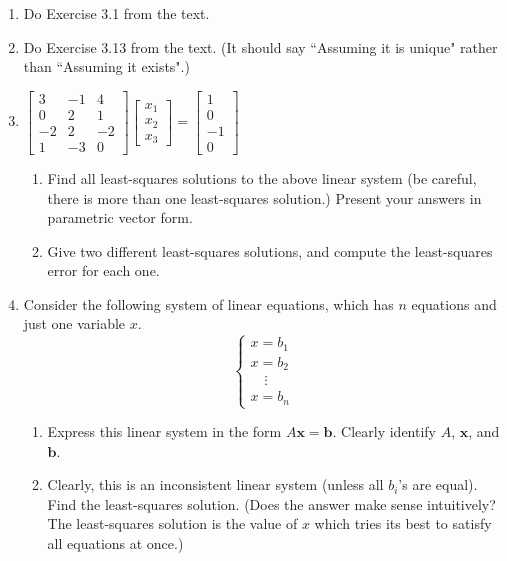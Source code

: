 \documentclass{article}
\newcommand{\x}{\mathbf{x}}
\renewcommand{\b}{\mathbf{b}}
\newcommand{\0}{\mathbf{0}}
\begin{document}
\begin{enumerate}
	\item Do Exercise 3.1 from the text.
	

	
	\item Do Exercise 3.13 from the text.  (It should say ``Assuming it is unique" rather than ``Assuming it exists".)
	
	\item $\begin{bmatrix}
	3 & -1 & 4\\
	0 & 2 & 1\\
	-2 & 2 & -2\\
	1 & -3 & 0
	\end{bmatrix}\begin{bmatrix}
	x_1\\ x_2\\ x_3
	\end{bmatrix} = \begin{bmatrix}
	1\\ 0\\ -1\\ 0
	\end{bmatrix}$ \begin{enumerate}
		\item Find all least-squares solutions to the above linear system (be careful, there is more than one least-squares solution.)  Present your answers in parametric vector form.
		\item Give two different least-squares solutions, and compute the least-squares error for each one.
	\end{enumerate}
	
	\item Consider the following system of linear equations, which has $n$ equations and just one variable $x$.
	\[\left\{\begin{array}{l}
	x = b_1\\
	x = b_2\\
	\quad \vdots \\
	x = b_n
	\end{array}\right.\]
	\begin{enumerate}
		\item Express this linear system in the form $A\x = \b$.  Clearly identify $A$, $\x$, and $\b$.
		\item Clearly, this is an inconsistent linear system (unless all $b_i$'s are equal).  Find the least-squares solution.  (Does the answer make sense intuitively?  The least-squares solution is the value of $x$ which tries its best to satisfy all equations at once.)
	\end{enumerate}


\end{enumerate}
\end{document}
